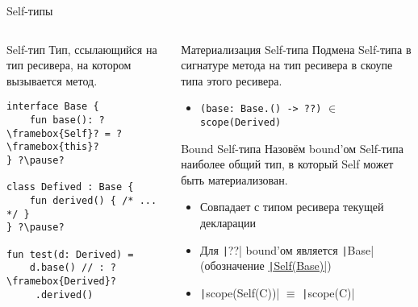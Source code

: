 \documentclass[aspectratio=169,usenames,dvipsnames]{beamer}
\begin{document}
    \begin{frame}[fragile]{Self-типы}
        \begin{columns}[onlytextwidth]
            \begin{column}[t]{0.43\textwidth}
                \begin{block}{Self-тип}
                    Тип, ссылающийся на тип ресивера, на котором вызывается метод.
                    \pause
                    \begin{verbatim}
interface Base {
    fun base(): ?\framebox{Self}? = ?\framebox{this}?
} ?\pause?

class Defived : Base {
    fun derived() { /* ... */ }
} ?\pause?

fun test(d: Derived) =
    d.base() // : ?\framebox{Derived}?
     .derived()
                    \end{verbatim}
                \end{block}
            \end{column}\hfill%
            \begin{column}[t]{0.53\textwidth}
                \pause
                \begin{block}{Материализация Self-типа}
                    Подмена Self-типа в сигнатуре метода на тип ресивера в скоупе типа этого ресивера.
                    \pause
                    \begin{itemize}
                        \item \texttt{(base: Base.() -> ??)} $\in$ \texttt{scope(Derived)}
                    \end{itemize}
                \end{block}
                \pause
                \begin{block}{Bound Self-типа}
                    Назовём bound'ом Self-типа наиболее общий тип, в который Self может быть материализован. \pause \vspace{-1em}
                    \begin{itemize}
                        \item Совпадает с типом ресивера текущей декларации
                        \item Для \texttt|??| bound'ом является \texttt|Base| (обозначение \underline{\texttt|Self(Base)|})
                        \item \texttt|scope(Self(C))| $\equiv$ \texttt|scope(C)|
                    \end{itemize}
                \end{block}
            \end{column}
        \end{columns}
    \end{frame}
\end{document}
